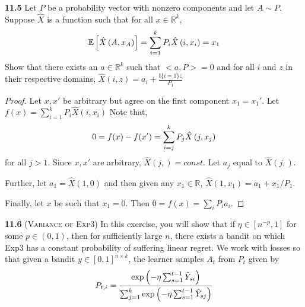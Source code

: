 \noindent\textbf{11.5} Let $P$ be a probability vector with nonzero components and let $A\sim P$. Suppose $\hat{X}$ is a function such that for all $x\in \mathbb{R}^k$,
\begin{equation}
    \mathbb{E}\left[\hat{X}\left(A, x_{A}\right)\right]=\sum_{i=1}^{k} P_{i} \hat{X}\left(i, x_{i}\right)=x_{1}\notag
\end{equation}
Show that there exists an $a\in \mathbb{R}^k$ such that $<a,P>=0$ and for all $i$ and $z$ in their respective domains, $\hat{X}(i, z)=a_{i}+\frac{\mathbb{I}\{i=1\} z}{P_{1}}$
\begin{proof}
    Let $x, x'$ be arbitrary but agree on the first component $x_1=x_1'$. Let $f(x)=\sum_{i=1}^{k} P_{i} \hat{X}\left(i, x_{i}\right)$ Note that,
    \begin{equation}
        0=f(x)-f(x')=\sum_{i=j}^{k} P_{j} \hat{X}\left(j, x_{j}\right)\notag
    \end{equation}
    for all $j>1$. Since $x, x'$ are arbitrary, $\hat{X}(j, )=const$. Let $a_j$ equal to $\hat{X}(j, )$.
    \par Further, let $a_1=\hat{X}(1, 0)$ and then given any $x_1\in \mathbb{R}$, $\hat{X}\left(1, x_{1}\right)=a_{1}+x_{1} / P_{1}$.
    \par Finally, let $x$ be such that $x_1=0$. Then $0=f(x)=\sum_{i} P_{i} a_{i}$.
\end{proof}

\noindent\textbf{11.6}
(\textsc{Variance of Exp3}) In this exercise, you will show that 
if $\eta\in[n^{-p},1]$ for some $p\in(0,1)$,
then for sufficiently large $n$,
there exists a bandit on which Exp3 has a constant probability of suffering linear regret. We work with losses so that given a bandit $y \in[0, 1]^{n\times k}$, the learner samples $A_t$ from $P_t$ given by
\begin{align*}
    P_{t,i} = \frac{ \exp\left(-\eta\sum_{s=1}^{t-1}\hat{Y}_{si} \right) }{ \sum_{j=1}^k \exp\left(-\eta\sum_{s=1}^{t-1}\hat{Y}_{sj} \right) }
\end{align*}

